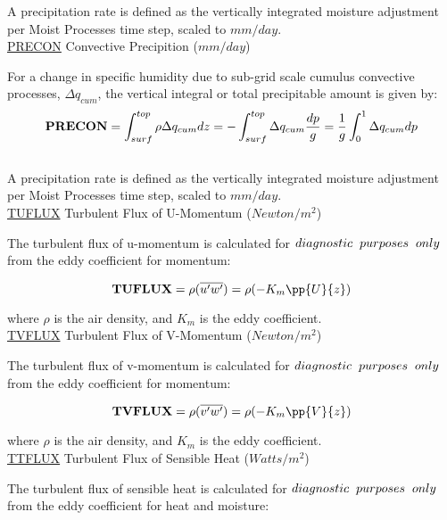 \noindent
A precipitation rate is defined as the vertically integrated moisture adjustment per Moist Processes
time step, scaled to $mm/day$.
\\

\noindent
{ \underline {PRECON} Convective Precipition ($mm/day$) } 

\noindent
For a change in specific humidity due to sub-grid scale cumulus convective processes, $\Delta q_{cum}$, 
the vertical integral or total precipitable amount is given by:   
\[
{\bf PRECON} = \int_{surf}^{top} \rho \Delta q_{cum} dz = - \int_{surf}^{top} \Delta  q_{cum}
{dp \over g} = {1 \over g} \int_0^1 \Delta q_{cum} dp
\]
\\

\noindent
A precipitation rate is defined as the vertically integrated moisture adjustment per Moist Processes
time step, scaled to $mm/day$.
\\

\noindent
{ \underline {TUFLUX}  Turbulent Flux of U-Momentum ($Newton/m^2$) }

\noindent
The turbulent flux of u-momentum is calculated for $diagnostic \hspace{.2cm} purposes
 \hspace{.2cm} only$ from the eddy coefficient for momentum:

\[
{\bf TUFLUX} =  {\rho } {(\overline{u^{\prime}w^{\prime}})} =  
{\rho } {(- K_m \pp{U}{z})}
\]
 
\noindent
where $\rho$ is the air density, and $K_m$ is the eddy coefficient.
\\

\noindent
{ \underline {TVFLUX}  Turbulent Flux of V-Momentum ($Newton/m^2$) }

\noindent
The turbulent flux of v-momentum is calculated for $diagnostic \hspace{.2cm} purposes 
\hspace{.2cm} only$ from the eddy coefficient for momentum:

\[
{\bf TVFLUX} =  {\rho } {(\overline{v^{\prime}w^{\prime}})} = 
 {\rho } {(- K_m \pp{V}{z})}
\]
 
\noindent
where $\rho$ is the air density, and $K_m$ is the eddy coefficient.
\\


\noindent
{ \underline {TTFLUX}  Turbulent Flux of Sensible Heat ($Watts/m^2$) }

\noindent
The turbulent flux of sensible heat is calculated for $diagnostic \hspace{.2cm} purposes 
\hspace{.2cm} only$ from the eddy coefficient for heat and moisture:

